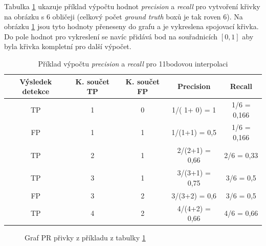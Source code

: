 Tabulka \ref{tabulka:prkrivka} ukazuje příklad výpočtu hodnot \emph{precision} a \emph{recall} pro vytvoření křivky na obrázku s 6 obličeji (celkový počet \emph{ground truth} boxů je tak roven 6). Na obrázku \ref{obrazek:prkrivka} jsou tyto hodnoty přeneseny do grafu a je vykreslena spojovací křivka. Do pole hodnot pro vykreslení se navíc přidává bod na souřadnicích $[0, 1]$ aby byla křivka kompletní pro další výpočet.

\begin{table}[H]
  \begin{tabular}{|c|c|c|c|c|}
  \hline
  \rowcolor[HTML]{E0DBDB} 
  \textbf{Výsledek detekce} & \textbf{K. součet TP} & \textbf{K. součet FP} & \textbf{Precision} & \textbf{Recall} \\ \hline
  TP         & {\color[HTML]{3531FF} 1} & {\color[HTML]{FE0000} 0} & {\color[HTML]{3531FF} 1}/({\color[HTML]{3531FF} 1}+{\color[HTML]{FE0000} 0}) = 1 & {\color[HTML]{3531FF} 1}/6 = 0,166     \\ \hline
  FP    & 1   & 1     & 1/(1+1) = 0,5    & 1/6 = 0,166 \\ \hline
  TP   & 2    & 1   & 2/(2+1) = 0,66   & 2/6 = 0,33      \\ \hline
  TP    & 3    & 1   & 3/(3+1) = 0,75     & 3/6 = 0,5       \\ \hline
  FP   & 3     & 2     & 3/(3+2) = 0,6     & 3/6 = 0,5       \\ \hline
  TP  & 4    & 2   & 4/(4+2) = 0,66  & 4/6 = 0,66    \\ \hline
  \end{tabular}
  \label{tabulka:prkrivka}
  \caption{Příklad výpočtu \emph{precision} a \emph{recall} pro 11bodovou interpolaci}
\end{table}

\begin{figure}[H] 
  \begin{center}
  \label{obrazek:prkrivka}
  \caption{Graf PR přivky z příkladu z tabulky \ref{tabulka:prkrivka}}
  \end{center}
\end{figure}

